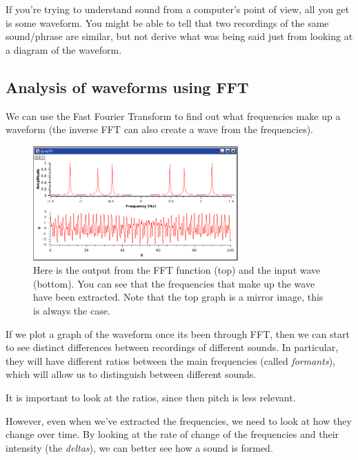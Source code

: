 If you're trying to understand sound from a computer's point of view, all you
get is some waveform. You might be able to tell that two recordings of the same
sound/phrase are similar, but not derive what was being said just from looking
at a diagram of the waveform.

\subsection{Analysis of waveforms using FFT}


We can use the Fast Fourier Transform to find out what frequencies make up a
waveform (the inverse FFT can also create a wave from the frequencies).

\begin{figure}[H]
  \centering
  \includegraphics[width=0.7\textwidth]{images/fft}
  \caption{Here is the output from the FFT function (top) and the input wave
  (bottom). You can see that the frequencies that make up the wave have been 
  extracted. Note that the top graph is a mirror image, this is always the
  case.}
  \label{fig:fft}
\end{figure}

If we plot a graph of the waveform once its been through FFT, then we can start
to see distinct differences between recordings of different sounds. In
particular, they will have different ratios between the main frequencies (called
\textit{formants}), which will allow us to distinguish between different sounds.

It is important to look at the ratios, since then pitch is less relevant.

However, even when we've extracted the frequencies, we need to look at how they
change over time. By looking at the rate of change of the frequencies and their
intensity (the \textit{deltas}), we can better see how a sound is formed.

